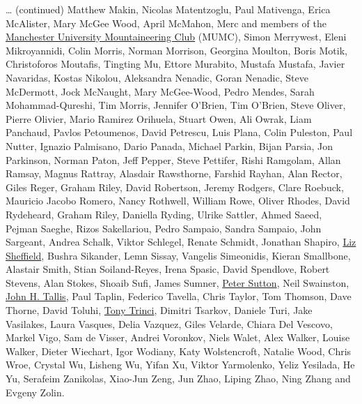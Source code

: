 \documentclass[
]{book}
\begin{document}
\ldots{} (continued) Matthew Makin, Nicolas Matentzoglu, Paul Mativenga, Erica McAlister, Mary McGee Wood, April McMahon, Merc and members of the \href{https://www.mumc.me.uk/wordpress}{Manchester University Mountaineering Club} (MUMC), Simon Merrywest, Eleni Mikroyannidi, Colin Morris, Norman Morrison, Georgina Moulton, Boris Motik, Christoforos Moutafis, Tingting Mu, Ettore Murabito, Mustafa Mustafa, Javier Navaridas, Kostas Nikolou, Aleksandra Nenadic, Goran Nenadic, Steve McDermott, Jock McNaught, Mary McGee-Wood, Pedro Mendes, Sarah Mohammad-Qureshi, Tim Morris, Jennifer O'Brien, Tim O'Brien, Steve Oliver, Pierre Olivier, Mario Ramirez Orihuela, Stuart Owen, Ali Owrak, Liam Panchaud, Pavlos Petoumenos, David Petrescu, Luis Plana, Colin Puleston, Paul Nutter, Ignazio Palmisano, Dario Panada, Michael Parkin, Bijan Parsia, Jon Parkinson, Norman Paton, Jeff Pepper, Steve Pettifer, Rishi Ramgolam, Allan Ramsay, Magnus Rattray, Alasdair Rawsthorne, Farshid Rayhan, Alan Rector, Giles Reger, Graham Riley, David Robertson, Jeremy Rodgers, Clare Roebuck, Mauricio Jacobo Romero, Nancy Rothwell, William Rowe, Oliver Rhodes, David Rydeheard, Graham Riley, Daniella Ryding, Ulrike Sattler, Ahmed Saeed, Pejman Saeghe, Rizos Sakellariou, Pedro Sampaio, Sandra Sampaio, John Sargeant, Andrea Schalk, Viktor Schlegel, Renate Schmidt, Jonathan Shapiro, \href{https://www.manchester.ac.uk/discover/governance/structure/board-governors/members/liz-sheffield/}{Liz Sheffield}, Bushra Sikander, Lemn Sissay, Vangelis Simeonidis, Kieran Smallbone, Alastair Smith, Stian Soiland-Reyes, Irena Spasic, David Spendlove, Robert Stevens, Alan Stokes, Shoaib Sufi, James Sumner, \href{https://github.com/dj-foxxy}{Peter Sutton}, Neil Swainston, \href{https://www.springer.com/gp/book/9780412303203}{John H. Tallis}, Paul Taplin, Federico Tavella, Chris Taylor, Tom Thomson, Dave Thorne, David Toluhi, \href{https://www.theguardian.com/science/2020/nov/10/tony-trinci-obituary}{Tony Trinci}, Dimitri Tsarkov, Daniele Turi, Jake Vasilakes, Laura Vasques, Delia Vazquez, Giles Velarde, Chiara Del Vescovo, Markel Vigo, Sam de Visser, Andrei Voronkov, Niels Walet, Alex Walker, Louise Walker, Dieter Wiechart, Igor Wodiany, Katy Wolstencroft, Natalie Wood, Chris Wroe, Crystal Wu, Lisheng Wu, Yifan Xu, Viktor Yarmolenko, Yeliz Yesilada, He Yu, Serafeim Zanikolas, Xiao-Jun Zeng, Jun Zhao, Liping Zhao, Ning Zhang and Evgeny Zolin.
\end{document}
